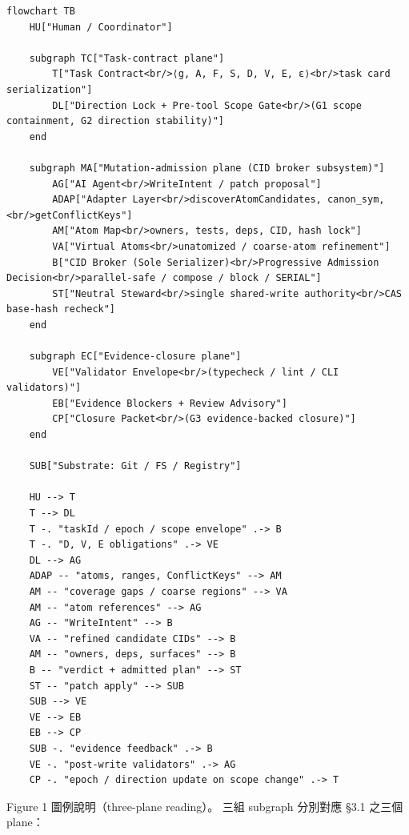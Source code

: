 \documentclass[a4paper,fontset=none]{ctexart}
\begin{document}
\begin{Verbatim}[breaklines=true,fontsize=\footnotesize]
flowchart TB
    HU["Human / Coordinator"]

    subgraph TC["Task-contract plane"]
        T["Task Contract<br/>⟨g, A, F, S, D, V, E, ε⟩<br/>task card serialization"]
        DL["Direction Lock + Pre-tool Scope Gate<br/>(G1 scope containment, G2 direction stability)"]
    end

    subgraph MA["Mutation-admission plane (CID broker subsystem)"]
        AG["AI Agent<br/>WriteIntent / patch proposal"]
        ADAP["Adapter Layer<br/>discoverAtomCandidates, canon_sym,<br/>getConflictKeys"]
        AM["Atom Map<br/>owners, tests, deps, CID, hash lock"]
        VA["Virtual Atoms<br/>unatomized / coarse-atom refinement"]
        B["CID Broker (Sole Serializer)<br/>Progressive Admission Decision<br/>parallel-safe / compose / block / SERIAL"]
        ST["Neutral Steward<br/>single shared-write authority<br/>CAS base-hash recheck"]
    end

    subgraph EC["Evidence-closure plane"]
        VE["Validator Envelope<br/>(typecheck / lint / CLI validators)"]
        EB["Evidence Blockers + Review Advisory"]
        CP["Closure Packet<br/>(G3 evidence-backed closure)"]
    end

    SUB["Substrate: Git / FS / Registry"]

    HU --> T
    T --> DL
    T -. "taskId / epoch / scope envelope" .-> B
    T -. "D, V, E obligations" .-> VE
    DL --> AG
    ADAP -- "atoms, ranges, ConflictKeys" --> AM
    AM -- "coverage gaps / coarse regions" --> VA
    AM -- "atom references" --> AG
    AG -- "WriteIntent" --> B
    VA -- "refined candidate CIDs" --> B
    AM -- "owners, deps, surfaces" --> B
    B -- "verdict + admitted plan" --> ST
    ST -- "patch apply" --> SUB
    SUB --> VE
    VE --> EB
    EB --> CP
    SUB -. "evidence feedback" .-> B
    VE -. "post-write validators" .-> AG
    CP -. "epoch / direction update on scope change" .-> T
\end{Verbatim}

Figure 1 圖例說明（three-plane reading）。 三組 subgraph 分別對應 §3.1 之三個 plane：
\end{document}
